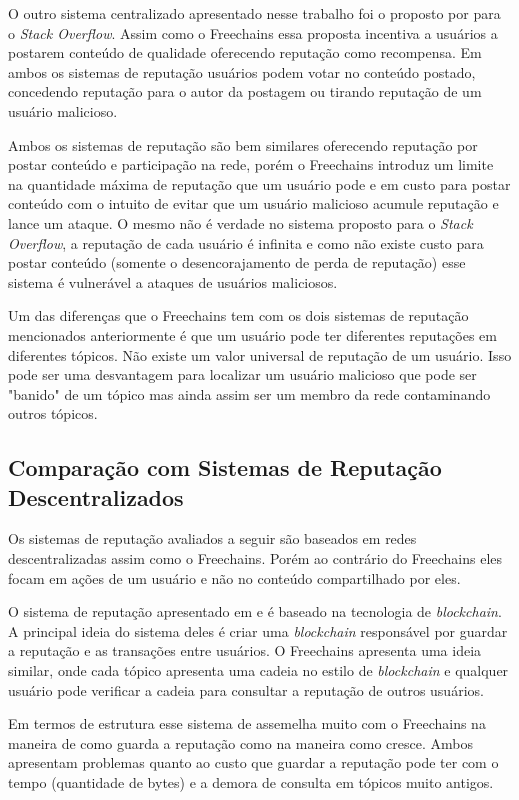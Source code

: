\documentclass[12pt]{article}
\newcommand{\FC} {Freechains\xspace}
\begin{document}
O outro sistema centralizado apresentado nesse trabalho foi o proposto por \cite{huna2016exploiting} para o \emph{Stack Overflow}.
Assim como o \FC essa proposta incentiva a usuários a postarem conteúdo de qualidade oferecendo reputação como recompensa. Em ambos os sistemas de reputação usuários podem votar no conteúdo postado, concedendo reputação para o autor da postagem ou tirando reputação de um usuário malicioso. 

Ambos os sistemas de reputação são bem similares oferecendo reputação por postar conteúdo e participação na rede, porém o \FC introduz um limite na quantidade máxima de reputação que um usuário pode e em custo para postar conteúdo com o intuito de evitar que um usuário malicioso acumule reputação e lance um ataque. O mesmo não é verdade no sistema proposto para o \emph{Stack Overflow}, a reputação de cada usuário é infinita e como não existe custo para postar conteúdo (somente o desencorajamento de perda de reputação) esse sistema é vulnerável a ataques de usuários maliciosos.

Um das diferenças que o \FC tem com os dois sistemas de reputação mencionados anteriormente é que um usuário pode ter diferentes reputações em diferentes tópicos. Não existe um valor universal de reputação de um usuário. Isso pode ser uma desvantagem para localizar um usuário malicioso que pode ser "banido" de um tópico mas ainda assim ser um membro da rede contaminando outros tópicos.  

\subsection{Comparação com Sistemas de Reputação Descentralizados} \label{subsec:CompSRD}

Os sistemas de reputação avaliados a seguir são baseados em redes descentralizadas assim como o \FC. Porém ao contrário do \FC  eles focam em ações de um usuário e não no conteúdo compartilhado por eles.

O sistema de reputação apresentado em \cite{dennis2015rep} e \cite{dennis2016rep} é baseado na tecnologia de \emph{blockchain}. A principal ideia do sistema deles é criar uma \emph{blockchain} responsável por guardar a reputação e as transações entre usuários. O \FC apresenta uma ideia similar, onde cada tópico apresenta uma cadeia no estilo de \emph{blockchain} e qualquer usuário pode verificar a cadeia para consultar a reputação de outros usuários.

Em termos de estrutura esse sistema de assemelha muito com o \FC na maneira de como guarda a reputação como na maneira como cresce. Ambos apresentam problemas quanto ao custo que guardar a reputação pode ter com o tempo (quantidade de bytes) e a demora de consulta em tópicos muito antigos.
\end{document}
